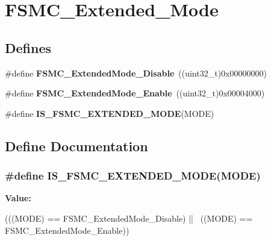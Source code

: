 \hypertarget{group__FSMC__Extended__Mode}{
\section{FSMC\_\-Extended\_\-Mode}
\label{group__FSMC__Extended__Mode}
}
\subsection*{Defines}
\begin{DoxyCompactItemize}
\item 
\hypertarget{group__FSMC__Extended__Mode_ga5a1f1acdc44328158f59012748980dd3}{
\#define {\bfseries FSMC\_\-ExtendedMode\_\-Disable}~((uint32\_\-t)0x00000000)}
\label{group__FSMC__Extended__Mode_ga5a1f1acdc44328158f59012748980dd3}

\item 
\hypertarget{group__FSMC__Extended__Mode_gaef9ff4c81a52fdb0471d2c4422271d2a}{
\#define {\bfseries FSMC\_\-ExtendedMode\_\-Enable}~((uint32\_\-t)0x00004000)}
\label{group__FSMC__Extended__Mode_gaef9ff4c81a52fdb0471d2c4422271d2a}

\item 
\#define {\bfseries IS\_\-FSMC\_\-EXTENDED\_\-MODE}(MODE)
\end{DoxyCompactItemize}


\subsection{Define Documentation}
\hypertarget{group__FSMC__Extended__Mode_ga79849ea07bf2a8f09989a6babd9e66e2}{
\subsubsection[{IS\_\-FSMC\_\-EXTENDED\_\-MODE}]{\setlength{\rightskip}{0pt plus 5cm}\#define IS\_\-FSMC\_\-EXTENDED\_\-MODE(MODE)}}
\label{group__FSMC__Extended__Mode_ga79849ea07bf2a8f09989a6babd9e66e2}
{\bfseries Value:}
\begin{DoxyCode}
(((MODE) == FSMC_ExtendedMode_Disable) || \
                                     ((MODE) == FSMC_ExtendedMode_Enable))
\end{DoxyCode}

